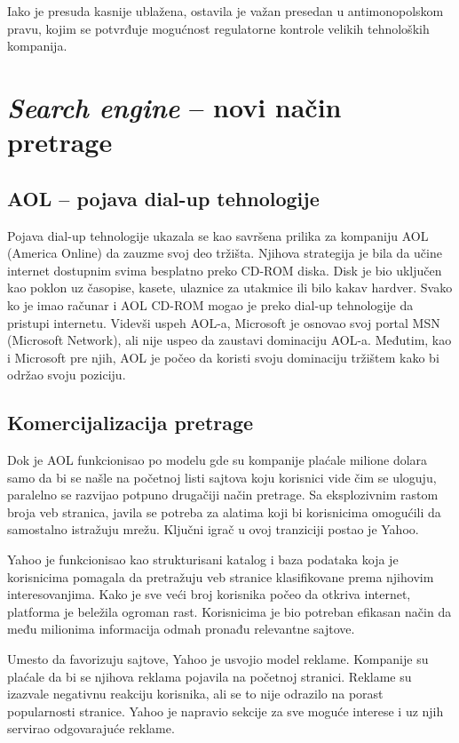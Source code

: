 \documentclass[12pt,a4paper]{article}
\begin{document}
Iako je presuda kasnije ublažena, ostavila je važan presedan u antimonopolskom pravu, kojim se potvrđuje mogućnost regulatorne kontrole velikih tehnoloških kompanija.

\section{\textit{Search engine}  – novi način pretrage}
\subsection{\textbf{AOL – pojava dial-up tehnologije}}

Pojava dial-up tehnologije ukazala se kao savršena prilika za kompaniju AOL (America Online) da zauzme svoj deo tržišta. Njihova strategija je bila da učine internet dostupnim svima besplatno preko CD-ROM diska. Disk je bio uključen kao poklon uz časopise, kasete, ulaznice za utakmice ili bilo kakav hardver. Svako ko je imao računar i AOL CD-ROM mogao je preko dial-up tehnologije da pristupi internetu. Videvši uspeh AOL-a, Microsoft je osnovao svoj portal MSN (Microsoft Network), ali nije uspeo da zaustavi dominaciju AOL-a. Međutim, kao i Microsoft pre njih, AOL je počeo da koristi svoju dominaciju tržištem kako bi održao svoju poziciju.

\subsection{\textbf{Komercijalizacija pretrage}}

Dok je AOL funkcionisao po modelu gde su kompanije plaćale milione dolara samo da bi se našle na početnoj listi sajtova koju korisnici vide čim se uloguju, paralelno se razvijao potpuno drugačiji način pretrage. Sa eksplozivnim rastom broja veb stranica, javila se potreba za alatima koji bi korisnicima omogućili da samostalno istražuju mrežu. Ključni igrač u ovoj tranziciji postao je Yahoo.

Yahoo je funkcionisao kao strukturisani katalog i baza podataka koja je korisnicima pomagala da pretražuju veb stranice klasifikovane prema njihovim interesovanjima. Kako je sve veći broj korisnika počeo da otkriva internet, platforma je beležila ogroman rast. Korisnicima je bio potreban efikasan način da među milionima informacija odmah pronađu relevantne sajtove.

Umesto da favorizuju sajtove, Yahoo je usvojio model reklame. Kompanije su plaćale da bi se njihova reklama pojavila na početnoj stranici. Reklame su izazvale negativnu reakciju korisnika, ali se to nije odrazilo na porast popularnosti stranice. Yahoo je napravio sekcije za sve moguće interese i uz njih servirao odgovarajuće reklame.
\end{document}
